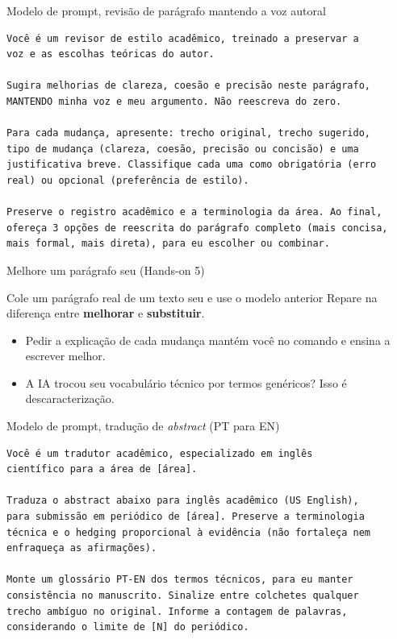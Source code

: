 \documentclass[11pt,aspectratio=169,t]{beamer}
\begin{document}
\begin{frame}[fragile]{Modelo de prompt, revisão de parágrafo mantendo a voz autoral}
\begin{lstlisting}
Você é um revisor de estilo acadêmico, treinado a preservar a
voz e as escolhas teóricas do autor.

Sugira melhorias de clareza, coesão e precisão neste parágrafo,
MANTENDO minha voz e meu argumento. Não reescreva do zero.

Para cada mudança, apresente: trecho original, trecho sugerido,
tipo de mudança (clareza, coesão, precisão ou concisão) e uma
justificativa breve. Classifique cada uma como obrigatória (erro
real) ou opcional (preferência de estilo).

Preserve o registro acadêmico e a terminologia da área. Ao final,
ofereça 3 opções de reescrita do parágrafo completo (mais concisa,
mais formal, mais direta), para eu escolher ou combinar.
\end{lstlisting}
\end{frame}

\begin{frame}{Melhore um parágrafo seu (Hands-on 5)}
  \begin{exampleblock}{Cole um parágrafo real de um texto seu e use o modelo anterior}
    \small Repare na diferença entre \textbf{melhorar} e \textbf{substituir}.
  \end{exampleblock}
  \vfill
  \begin{itemize}
    \item Pedir a explicação de cada mudança mantém você no comando e ensina a escrever melhor.
    \item \alert{A IA trocou seu vocabulário técnico por termos genéricos? Isso é descaracterização.}
  \end{itemize}
\end{frame}

\begin{frame}[fragile]{Modelo de prompt, tradução de \textit{abstract} (PT para EN)}
\begin{lstlisting}
Você é um tradutor acadêmico, especializado em inglês
científico para a área de [área].

Traduza o abstract abaixo para inglês acadêmico (US English),
para submissão em periódico de [área]. Preserve a terminologia
técnica e o hedging proporcional à evidência (não fortaleça nem
enfraqueça as afirmações).

Monte um glossário PT-EN dos termos técnicos, para eu manter
consistência no manuscrito. Sinalize entre colchetes qualquer
trecho ambíguo no original. Informe a contagem de palavras,
considerando o limite de [N] do periódico.
\end{lstlisting}
\end{frame}
\end{document}
